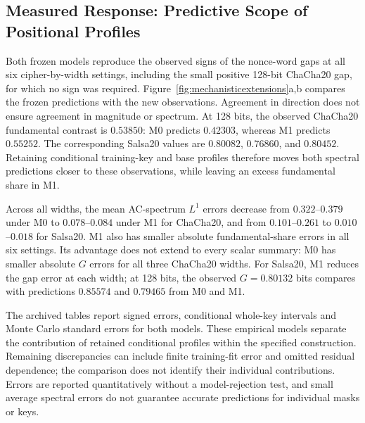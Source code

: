 \subsection{Measured Response: Predictive Scope of Positional Profiles}\label{sec:spectralpredictionresults}

Both frozen models reproduce the observed signs of the nonce-word gaps at all six cipher-by-width settings, including the small positive 128-bit ChaCha20 gap, for which no sign was required. Figure~\ref{fig:mechanisticextensions}a,b compares the frozen predictions with the new observations. Agreement in direction does not ensure agreement in magnitude or spectrum. At 128 bits, the observed ChaCha20 fundamental contrast is $0.53850$: M0 predicts $0.42303$, whereas M1 predicts $0.55252$. The corresponding Salsa20 values are $0.80082$, $0.76860$, and $0.80452$. Retaining conditional training-key and base profiles therefore moves both spectral predictions closer to these observations, while leaving an excess fundamental share in M1.

Across all widths, the mean AC-spectrum $L^1$ errors decrease from $0.322$--$0.379$ under M0 to $0.078$--$0.084$ under M1 for ChaCha20, and from $0.101$--$0.261$ to $0.010$--$0.018$ for Salsa20. M1 also has smaller absolute fundamental-share errors in all six settings. Its advantage does not extend to every scalar summary: M0 has smaller absolute $G$ errors for all three ChaCha20 widths. For Salsa20, M1 reduces the gap error at each width; at 128 bits, the observed $G=0.80132$ bits compares with predictions $0.85574$ and $0.79465$ from M0 and M1.

The archived tables report signed errors, conditional whole-key intervals and Monte Carlo standard errors for both models. These empirical models separate the contribution of retained conditional profiles within the specified construction. Remaining discrepancies can include finite training-fit error and omitted residual dependence; the comparison does not identify their individual contributions. Errors are reported quantitatively without a model-rejection test, and small average spectral errors do not guarantee accurate predictions for individual masks or keys.
